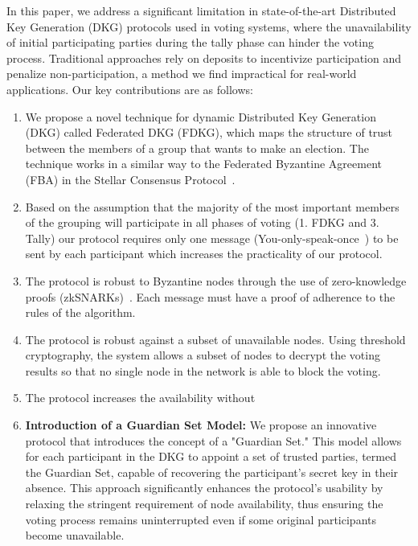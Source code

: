 \documentclass{article}
\begin{document}
In this paper, we address a significant limitation in state-of-the-art Distributed Key Generation (DKG) protocols used in voting systems, where the unavailability of initial participating parties during the tally phase can hinder the voting process. Traditional approaches rely on deposits to incentivize participation and penalize non-participation, a method we find impractical for real-world applications. Our key contributions are as follows:

\begin{enumerate}
    \item We propose a novel technique for dynamic Distributed Key Generation (DKG) called Federated DKG (FDKG), which maps the structure of trust between the members of a group that wants to make an election. The technique works in a similar way to the Federated Byzantine Agreement (FBA) in the Stellar Consensus Protocol~\cite{mazieresStellarConsensusProtocol2015}.
    \item Based on the assumption that the majority of the most important members of the grouping will participate in all phases of voting (1. FDKG and 3. Tally) our protocol requires only one message (You-only-speak-once~\cite{gentryYOSOYouOnly2021}) to be sent by each participant which increases the practicality of our protocol.
    \item The protocol is robust to Byzantine nodes through the use of zero-knowledge proofs (zkSNARKs)~\cite{parnoPinocchioNearlyPractical2013}. Each message must have a proof of adherence to the rules of the algorithm.
    \item The protocol is robust against a subset of unavailable nodes. Using threshold cryptography, the system allows a subset of nodes to decrypt the voting results so that no single node in the network is able to block the voting. %
    \item The protocol increases the availability without
    
    \item \textbf{Introduction of a Guardian Set Model:} We propose an innovative protocol that introduces the concept of a "Guardian Set." This model allows for each participant in the DKG to appoint a set of trusted parties, termed the Guardian Set, capable of recovering the participant's secret key in their absence. This approach significantly enhances the protocol's usability by relaxing the stringent requirement of node availability, thus ensuring the voting process remains uninterrupted even if some original participants become unavailable.


\end{enumerate}
\end{document}

